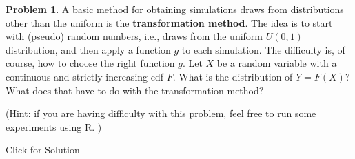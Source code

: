 \documentclass[
]{book}
\theoremstyle{definition}
\theoremstyle{definition}
\theoremstyle{definition}
\newtheorem{exercise}{Problem}[chapter]
\theoremstyle{definition}
\theoremstyle{remark}
\begin{document}
\begin{exercise}
A basic method for obtaining simulations draws from distributions
other than the uniform is the \textbf{transformation method}. The idea is
to start with (pseudo) random numbers, i.e., draws from the uniform
\(U(0,1)\) distribution, and then apply a function \(g\) to each
simulation. The difficulty is, of course, how to choose the right
function \(g\). Let \(X\) be a random variable with a continuous and
strictly increasing cdf \(F\). What is the distribution of \(Y=F (X)\)? What does that have to do with the transformation method?

(Hint: if you are having difficulty with this problem, feel free to
run some experiments using R. )
\end{exercise}

Click for Solution
\end{document}
